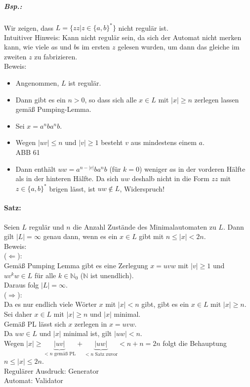 \subparagraph{Bsp.:} Wir zeigen, dass $L=\{zz|z\in \{a,b\}^*\}$ nicht regulär ist.\\
Intuitiver Hinweis: Kann nicht regulär sein, da sich der Automat nicht merken kann, wie viele $a$s und $b$s im ersten $z$ gelesen wurden, um dann das gleiche im zweiten $z$ zu fabrizieren.\\
Beweis: 
\begin{itemize}
\item Angenommen, $L$ ist regulär.
\item Dann gibt es ein $n>0$, so dass sich alle $x \in L$ mit $|x|\geq n$ zerlegen lassen gemäß Pumping-Lemma.
\item Sei $x=a^nb a^nb$.
\item Wegen $|uv|\leq n$ und $|v|\geq 1$ besteht $v$ aus mindestens einem $a$.\\
ABB 61
\item Dann enthält $uw=a^{n-|v|}ba^nb$ (für $k=0$) weniger $a$s in der vorderen Hälfte als in der hinteren Hälfte. Da sich $uw$ deshalb nicht in die Form $zz$ mit $z\in \{a,b\}^*$ brigen lässt, ist $uw \not \in L$, Widerspruch!
\end{itemize}

\paragraph{Satz:} Seien $L$ regulär und $n$ die Anzahl Zustände des Minimalautomaten zu $L$. Dann gilt $|L| = \infty$ genau dann, wenn es ein $x \in L$ gibt mit $n\leq  |x| < 2n$.\\
Beweis:\\
($\Leftarrow$):\\
Gemäß Pumping Lemma gibt es eine Zerlegung $x=uvw$ mit $|v| \geq 1$ und $uv^kw\in L$ für alle $k \in \mathbb{N}_0$ ($\mathbb{N}$ ist unendlich).\\
Daraus folg $|L|=\infty$.\\
($\Rightarrow$):\\
Da es nur endlich viele Wörter $x$ mit $|x|<n$ gibt, gibt es ein $x\in L$ mit $|x|\geq n$.\\
Sei daher $x\in L$ mit $|x| \geq n$ und $|x|$ minimal.\\
Gemäß PL lässt sich $x$ zerlegen in $x=uvw$.\\
Da $uw \in L$ und $|x|$ minimal ist, gilt $|uw|<n$.\\
Wegen $|x|\geq \underbrace{|uv|}_{<n \text{ gemäß PL}}+\underbrace{|uw|}_{<n \text{ Satz zuvor}}<n+n=2n$ folgt die Behauptung $n \leq |x| \leq 2n$. \\
Regulärer Ausdruck: Generator\\
Automat: Validator
